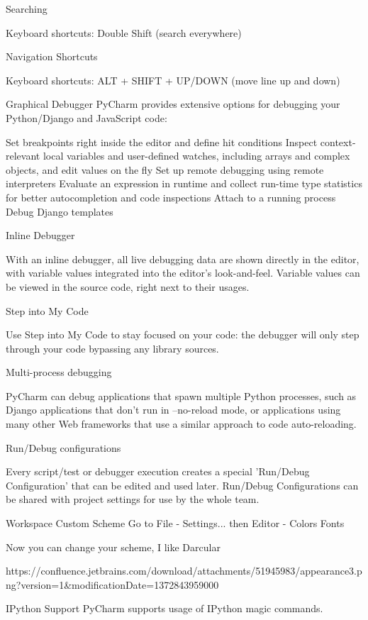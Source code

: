 Searching

Keyboard shortcuts: Double Shift (search everywhere)

Navigation
Shortcuts

Keyboard shortcuts: ALT + SHIFT + UP/DOWN (move line up and down)

Graphical Debugger
PyCharm provides extensive options for debugging your Python/Django and JavaScript code:

Set breakpoints right inside the editor and define hit conditions
Inspect context-relevant local variables and user-defined watches, including arrays and complex objects, and edit values on the fly
Set up remote debugging using remote interpreters
Evaluate an expression in runtime and collect run-time type statistics for better autocompletion and code inspections
Attach to a running process
Debug Django templates


Inline Debugger

With an inline debugger, all live debugging data are shown directly in the editor, with variable values integrated into the editor's look-and-feel. Variable values can be viewed in the source code, right next to their usages.

Step into My Code

Use Step into My Code to stay focused on your code: the debugger will only step through your code bypassing any library sources.

Multi-process debugging

PyCharm can debug applications that spawn multiple Python processes, such as Django applications that don't run in --no-reload mode, or applications using many other Web frameworks that use a similar approach to code auto-reloading.

Run/Debug configurations

Every script/test or debugger execution creates a special 'Run/Debug Configuration' that can be edited and used later. Run/Debug Configurations can be shared with project settings for use by the whole team.

Workspace
Custom Scheme
Go to File - Settings... then Editor - Colors Fonts

Now you can change your scheme, I like Darcular

https://confluence.jetbrains.com/download/attachments/51945983/appearance3.png?version=1&modificationDate=1372843959000

IPython Support
PyCharm supports usage of IPython magic commands.


